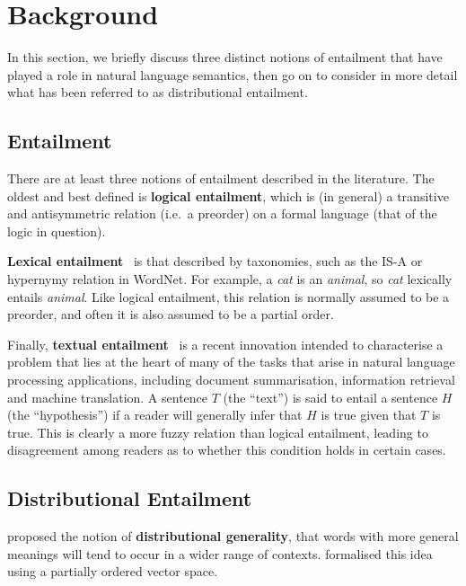 \section{Background}
\label{sec:background}

In this section, we  briefly discuss three distinct notions of entailment that have played a role
in natural language semantics, then go on to consider in more detail what has been referred to as
distributional entailment.

\subsection{Entailment}

There are at least three notions of entailment described in the
literature. The oldest and best defined is \textbf{logical entailment}, which
is (in general) a transitive and antisymmetric relation (i.e.~a
preorder) on a formal language (that of the logic in question).

\textbf{Lexical entailment}~\cite{Geffet:05} is that described by taxonomies, 
such as the IS-A
or hypernymy relation in WordNet. For example, a \emph{cat} is an
\emph{animal}, so \emph{cat} lexically entails \emph{animal}. 
Like logical entailment, this relation is normally
assumed to be a preorder, and often it is also assumed to be a partial
order.

Finally, \textbf{textual entailment}~\cite{Dagan:05} is a recent 
innovation intended to
characterise a problem that lies at the heart of many of the tasks 
that arise in natural language processing applications, including
document summarisation, information retrieval and machine
translation. A sentence $T$ (the ``text'') is said to entail a
sentence $H$ (the ``hypothesis'') if a reader will generally infer
that $H$ is true given that $T$ is true. This is clearly a more fuzzy
relation than logical entailment, leading to disagreement among readers
as to whether this condition holds in certain cases.

\subsection{Distributional Entailment}

 proposed the notion of \textbf{distributional
  generality}, that words with more general meanings will tend to
occur in a wider range of contexts.  formalised
this idea using a partially ordered vector space.

